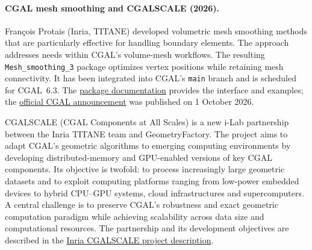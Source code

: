 \paragraph{CGAL mesh smoothing and CGALSCALE (2026).}
\label{sec:wp1:cgalscale}
François Protais (Inria, TITANE) developed volumetric mesh smoothing
methods that are particularly effective for handling boundary elements.
The approach addresses needs within CGAL's volume-mesh workflows.
The resulting \texttt{Mesh\_smoothing\_3} package optimizes vertex positions
while retaining mesh connectivity. It has been integrated into CGAL's
\texttt{main} branch and is scheduled for CGAL~6.3. The
\href{https://cgal.geometryfactory.com/CGAL/doc/main/Mesh_smoothing_3/index.html#Chapter_3D_Mesh_smoothing}{package documentation}
provides the interface and examples; the
\href{https://www.cgal.org/2026/10/01/mesh_smoothing_3/}{official CGAL announcement}
was published on 1 October 2026.

CGALSCALE (CGAL Components at All Scales) is a new i-Lab partnership
between the Inria TITANE team and GeometryFactory. The project aims to
adapt CGAL's geometric algorithms to emerging computing environments by
developing distributed-memory and GPU-enabled versions of key CGAL
components. Its objective is twofold: to process increasingly large
geometric datasets and to exploit computing platforms ranging from
low-power embedded devices to hybrid CPU--GPU systems, cloud
infrastructures and supercomputers. A central challenge is to preserve
CGAL's robustness and exact geometric computation paradigm while
achieving scalability across data size and computational resources.
The partnership and its development objectives are described in the
\href{https://jobs.inria.fr/public/classic/classic/offres/2026-10293}{Inria CGALSCALE project description}.
